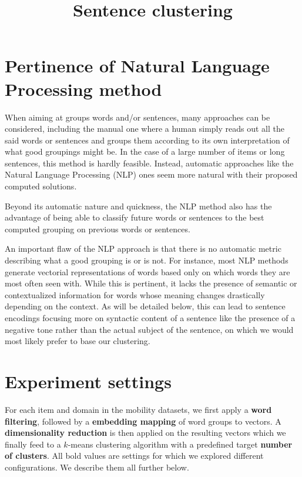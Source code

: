 \documentclass{article}
\title{Sentence clustering}
\date{}
\begin{document}
\maketitle

\section*{Pertinence of Natural Language Processing method}

When aiming at groups words and/or sentences, many approaches can be considered, including the
manual one where a human simply reads out all the said words or sentences and groups them
according to its own interpretation of what good groupings might be. In the case of a large number
of items or long sentences, this method is hardly feasible. Instead, automatic approaches
like the Natural Language Processing (NLP) ones seem more natural with their proposed computed
solutions.

Beyond its automatic nature and quickness, the NLP method also has the advantage of
being able to classify future words or sentences to the best computed grouping on previous
words or sentences.

An important flaw of the NLP approach is that there is no automatic metric describing what
a good grouping is or is not. For instance, most NLP methods generate vectorial representations
of words based only on which words they are most often seen with. While this is pertinent, it
lacks the presence of semantic or contextualized information for words whose meaning changes
drastically depending on the context. As will be detailed below, this can lead to sentence
encodings focusing more on syntactic content of a sentence like the presence of a negative tone
rather than the actual subject of the sentence, on which we would most likely prefer to base 
our clustering.


\section*{Experiment settings}

For each item and domain in the mobility datasets, we first apply a \textbf{word filtering},
followed by a \textbf{embedding mapping} of word groups to vectors. A \textbf{dimensionality reduction}
is then applied on the resulting vectors which we finally feed to a $k$-means clustering algorithm with
a predefined target \textbf{number of clusters}. All bold values are settings for which we explored
different configurations. We describe them all further below.
\end{document}
